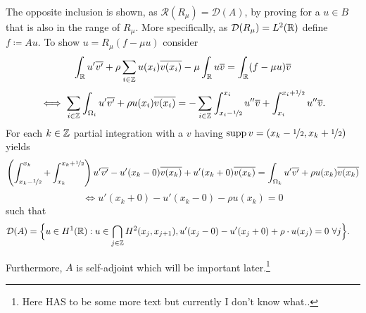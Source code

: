 The opposite inclusion is shown, as $\mathcal{R}(R_{\mu}) = \mathcal{D}(A)$, by proving for a $u \in B$ that is also in the range of $R_{\mu}$. More specifically, as $\mathcal{D}(R_{\mu}) = L^{2}(\mathbb{R})$ define $f \coloneqq A u$. To show $u = R_{\mu}(f - \mu u)$ consider
	\[ \int_{\mathbb{R}} u' \overline{v'} + \rho \sum_{i \in \mathbb{Z}} u(x_{i}) \overline{v(x_{i})} - \mu \int_{\mathbb{R}} u \overline{v}= \int_{\mathbb{R}}(f-\mu u) \overline{v} \]
	\[ \iff \sum_{i \in \mathbb{Z}} \int_{\Omega_{i}} u' \overline{v'} + \rho u(x_{i}) \overline{v(x_{i})} = - \sum_{i \in \mathbb{Z}} \int_{x_{i} - \nicefrac{1}{2}}^{x_{i}} u'' \overline{v} + \int_{x_{i}}^{x_{i} + \nicefrac{1}{2}} u'' \overline{v}. \]
	For each $k \in \mathbb{Z}$ partial integration with a $v$ having $\operatorname{supp} v = (x_{k} - \nicefrac{1}{2}, x_{k} + \nicefrac{1}{2})$ yields
	\[ \left( \int_{x_{k} - \nicefrac{1}{2}}^{x_{k}} + \int_{x_{k}}^{x_{k} +\nicefrac{1}{2}} \right) u' \overline{v'} - u'(x_{k}-0) \overline{v(x_{k})}  + u'(x_{k}+0) \overline{v(x_{k})}  = \int_{\Omega_{k}} u' \overline{v'} + \rho u(x_{k}) \overline{v(x_{k})} \]
	\[ \iff u'(x_{k}+0) - u'(x_{k}-0) - \rho u(x_{k}) = 0 \]
	such that
	\begin{align*}
		\mathcal{D}(A) & = \Big\{ u \in H^{1}(\mathbb{R}): u \in \bigcap_{j \in \mathbb{Z}} H^{2}(x_{j} , x_{j+1}), u'(x_{j} - 0) - u'(x_{j} + 0) + \rho \cdot u(x_{j}) = 0 ~\forall j \Big\}.
	\end{align*}

Furthermore, $A$ is self-adjoint which will be important later.\footnote{Here HAS to be some more text but currently I don't know what..}
\newpage %

